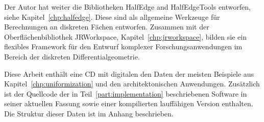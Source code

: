 \documentclass[Thesis.tex]{subfiles}
\begin{document}
Der Autor hat weiter die Bibliotheken {\sc HalfEdge} and {\sc HalfEdgeTools} entworfen, siehe Kapitel~\ref{chp:halfedge}.
Diese sind als allgemeine Werkzeuge f\"ur Berechnungen an diskreten F\"{a}chen entworfen.
Zusammen mit der Oberfl\"{a}chenbibliothek {\sc JRWorkspace}, Kapitel~\ref{chp:jrworkspace}, bilden sie ein flexibles Framework f\"{u}r den Entwurf komplexer Forschungsanwendungen im Bereich der diskreten Differentialgeometrie.

Diese Arbeit enth\"{a}lt eine CD mit digitalen den Daten der meisten Beispiele aus Kapitel~\ref{chp:uniformization} und den architektonischen Anwendungen.
Zus\"{a}tzlich ist der Quellcode der in Teil~\ref{part:implementation} beschriebenen Software in seiner aktuellen Fassung sowie einer kompilierten lauff\"{a}higen Version enthalten.
Die Struktur dieser Daten ist im Anhang beschrieben.

\subfilebibliography
\end{document}
